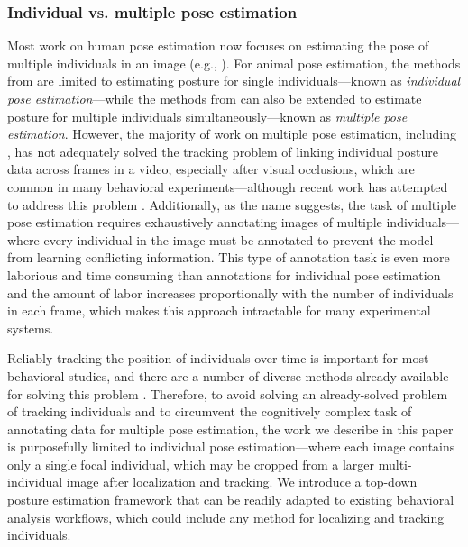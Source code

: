 \documentclass[11pt,a4paper,oneside]{article}
\begin{document}
\subsubsection{Individual vs. multiple pose estimation}
Most work on human pose estimation now focuses on estimating the pose of multiple individuals in an image (e.g., \citealt{cao2017realtime}). For animal pose estimation, the methods from \cite{pereira2019fast} are limited to estimating posture for single individuals—known as \textit{individual pose estimation}—while the methods from \cite{mathis2018deeplabcut} can also be extended to estimate posture for multiple individuals simultaneously---known as \textit{multiple pose estimation}. However, the majority of work on multiple pose estimation, including \cite{mathis2018deeplabcut}, has not adequately solved the tracking problem of linking individual posture data across frames in a video, especially after visual occlusions, which are common in many behavioral experiments—although recent work has attempted to address this problem \citep{iqbal2017posetrack, andriluka2018posetrack}. Additionally, as the name suggests, the task of multiple pose estimation requires exhaustively annotating images of multiple individuals—where every individual in the image must be annotated to prevent the model from learning conflicting information. This type of annotation task is even more laborious and time consuming than annotations for individual pose estimation and the amount of labor increases proportionally with the number of individuals in each frame, which makes this approach intractable for many experimental systems.

Reliably tracking the position of individuals over time is important for most behavioral studies, and there are a number of diverse methods already available for solving this problem \citep{perez2014idtracker, crall2015beetag, graving2017pinpoint, romero2018idtracker, wild2018honeybee,boenisch2018tracking}. Therefore, to avoid solving an already-solved problem of tracking individuals and to circumvent the cognitively complex task of annotating data for multiple pose estimation, the work we describe in this paper is purposefully limited to individual pose estimation---where each image contains only a single focal individual, which may be cropped from a larger multi-individual image after localization and tracking. We introduce a top-down posture estimation framework that can be readily adapted to existing behavioral analysis workflows, which could include any method for localizing and tracking individuals.
\end{document}
